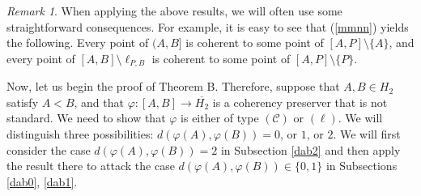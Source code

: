 \documentclass[10pt]{amsart}
\theoremstyle{definition}
\theoremstyle{remark}
\newtheorem{remark}[theorem]{Remark}
\numberwithin{subsection}{section}
\numberwithin{equation}{section}
\newcommand\oH{{\overline{H_2}}}
\begin{document}
\begin{remark}
When applying the above results, we will often use some straightforward consequences. 
For example, it is easy to see that (\ref{mmnn}) yields the following. 
Every point of $(A, B]$ is coherent to some point of $[A, P]\setminus\{ A\}$, and every point of $[A, B]\setminus \ell_{P, B}$ is coherent to some point of $[A, P]\setminus\{P \}$.
\end{remark}



Now, let us begin the proof of Theorem B.
Therefore, suppose that $A, B\in H_2$ satisfy $A<B$, and that $\varphi\colon [A, B]\to \oH$ is a coherency preserver that is not standard.
We need to show that $\varphi$ is either of type $(\mathcal{C})$ or $(\ell)$.
We will distinguish three possibilities: $d(\varphi (A), \varphi (B)) = 0$, or $1$, or $2$. 
We will first consider the case $d(\varphi (A), \varphi (B)) =2$ in Subsection \ref{dab2} and then apply the result there to attack the case $d(\varphi (A), \varphi (B)) \in \{0, 1\}$ in Subsections \ref{dab0}, \ref{dab1}.
\end{document}
